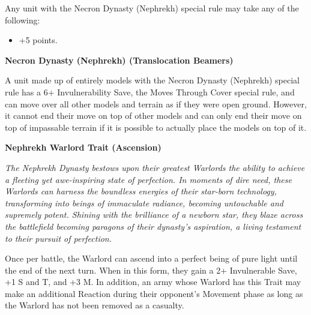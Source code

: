 Any unit with the Necron Dynasty (Nephrekh) special rule may take any of the following:
\begin{itemize}
	\item {} \dotfill +5 points.
\end{itemize}

\vspace*{2em}
\vspace*{1em}

\begin{multicols}{2}
	\textbf{Necron Dynasty (Nephrekh) (Translocation Beamers)} 
	
	A unit made up of entirely models with the Necron Dynasty (Nephrekh) special rule has a 6+ Invulnerability Save, the Moves Through Cover special rule, and can move over all other models and terrain as if they were open ground. However, it cannot end their move on top of other models and can only end their move on top of impassable terrain if it is possible to actually place the models on top of it.
	
	\textbf{Nephrekh Warlord Trait (Ascension)}
	
	\textit{The Nephrekh Dynasty bestows upon their greatest Warlords the ability to achieve a fleeting yet awe-inspiring state of perfection. In moments of dire need, these Warlords can harness the boundless energies of their star-born technology, transforming into beings of immaculate radiance, becoming untouchable and supremely potent. Shining with the brilliance of a newborn star, they blaze across the battlefield becoming paragons of their dynasty’s aspiration, a living testament to their pursuit of perfection.}
	
	Once per battle, the Warlord can ascend into a perfect being of pure light until the end of the next turn. When in this form, they gain a 2+ Invulnerable Save, +1 S and T, and +3 M. In addition, an army whose Warlord has this Trait may make an additional Reaction during their opponent’s Movement phase as long as the Warlord has not been removed as a casualty.
\end{multicols}


